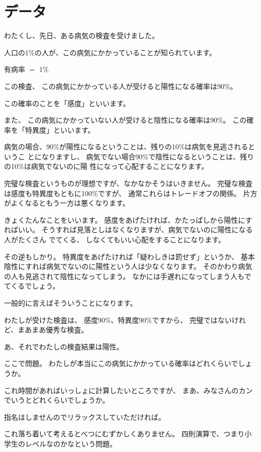 \documentclass[uplatex,jis2004,dvipdfmx,12pt]{jsarticle}
\begin{document}
\section{データ}

わたくし、先日、ある病気の検査を受けました。

人口の1\%の人が、この病気にかかっていることが知られています。

有病率 $=$ 1\%



この検査、
この病気にかかっている人が受けると陽性になる確率は90\%。

この確率のことを「感度」といいます。

また、
この病気にかかっていない人が受けると陰性になる確率は90\%。
この確率を「特異度」といいます。

病気の場合、90\%が陽性になるということは、残りの10\%は病気を見逃されるというこ
とになりますし、
病気でない場合90\%で陰性になるということは、残りの10\%は病気でないのに陽
性になって心配することになります。

完璧な検査というものが理想ですが、なかなかそうはいきません。
完璧な検査は感度も特異度もともに100\%ですが、
通常これらはトレードオフの関係。
片方がよくなるともう一方は悪くなります。

きょくたんなことをいいます。
感度をあげたければ、かたっぱしから陽性にすればいい。
そうすれば見落としはなくなりますが、病気でないのに陽性になる人がたくさん
でてくる、
しなくてもいい心配をすることになります。

その逆もしかり。
特異度をあげたければ「疑わしきは罰せず」というか、
基本陰性にすれば病気でないのに陽性という人は少なくなります。
そのかわり病気の人も見逃されて陰性になってしまう。
なかには手遅れになってしまう人もでてくるでしょう。

一般的に言えばそういうことになります。

わたしが受けた検査は、
感度90\%、特異度90\%ですから、
完璧ではないけれど、まあまあ優秀な検査。

あ、それでわたしの検査結果は陽性。

ここで問題。
わたしが本当にこの病気にかかっている確率はどれくらいでしょうか。

これ時間があればいっしょに計算したいところですが、
まあ、みなさんのカンでいうとどれくらいでしょうか。

指名はしませんのでリラックスしていただければ。

これ落ち着いて考えるとべつにむずかしくありません。
四則演算で、つまり小学生のレベルなのかなという問題。
\end{document}
